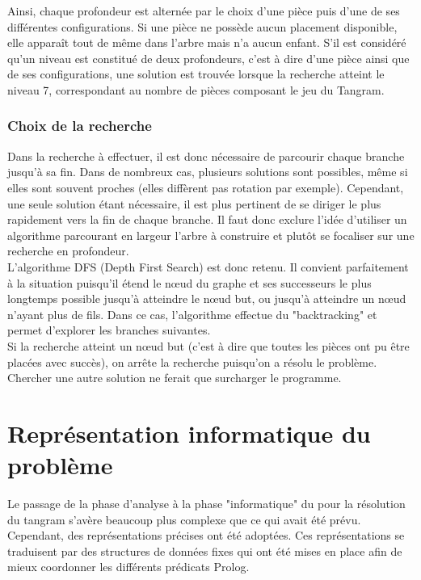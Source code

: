 \documentclass[a4paper, 11pt]{report}
\begin{document}
		Ainsi, chaque profondeur est alternée par le choix d'une pièce puis d'une de ses différentes configurations. Si une pièce ne possède aucun placement disponible, elle apparaît tout de même dans l'arbre mais n'a aucun enfant. S'il est considéré qu'un niveau est constitué de deux profondeurs, c'est à dire d'une pièce ainsi que de ses configurations, une solution est trouvée lorsque la recherche atteint le niveau 7, correspondant au nombre de pièces composant le
jeu du Tangram.

			\subsection{Choix de la recherche}

		Dans la recherche à effectuer, il est donc nécessaire de parcourir chaque branche jusqu'à sa fin. Dans de nombreux cas, plusieurs solutions sont possibles, m\^eme si elles sont souvent proches (elles diffèrent pas rotation par exemple). Cependant, une seule solution étant nécessaire, il est plus pertinent de se diriger le plus rapidement vers la fin de chaque branche. Il faut donc exclure l'idée d'utiliser un algorithme parcourant en largeur l'arbre à construire et plutôt se focaliser sur une recherche en profondeur.\\
		L'algorithme DFS (Depth First Search) est donc retenu. Il convient parfaitement à la situation puisqu'il étend le nœud du graphe et ses successeurs le plus longtemps possible jusqu'à atteindre le nœud but, ou jusqu'à atteindre un nœud
n'ayant plus de fils. Dans ce cas, l'algorithme effectue du "backtracking" et permet d'explorer les branches suivantes. \\
		Si la recherche atteint un nœud but (c'est à dire que toutes les pièces ont pu être placées avec succès), on arrête la recherche puisqu'on a résolu le problème. Chercher une autre solution ne ferait que surcharger le programme.


	\newpage
	
	\chapter{Représentation informatique du problème}
	
	Le passage de la phase d'analyse à la phase "informatique" du pour la résolution du tangram s'avère beaucoup plus complexe que ce qui avait été prévu. Cependant, des représentations précises ont été adoptées. Ces représentations se traduisent par des structures de données fixes qui ont été mises en place afin de mieux coordonner les différents prédicats Prolog.
\end{document}
